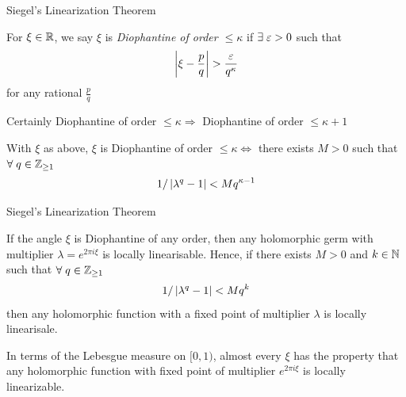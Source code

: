 \begin{frame}{Siegel's Linearization Theorem}
\begin{dfn}
For $\xi \in \mathbb{R}$, we say $\xi$ is \textit{Diophantine of order $\leq \kappa$} if\; $\exists\; \varepsilon > 0$ such that
\[
\left|\xi - \frac{p}{q}\right| > \frac{\varepsilon}{q^{\kappa}}
\]
for any rational $\frac{p}{q}$
\end{dfn}

Certainly Diophantine of order $\leq \kappa \Longrightarrow$ Diophantine of order $\leq \kappa + 1$

\begin{lem}
With $\xi$ as above, $\xi$ is Diophantine of order $\leq \kappa \Longleftrightarrow$ there exists $M > 0$ such that $\forall\; q \in \mathbb{Z}_{\geq 1}$
\[
1/\left|\lambda^{q}-1\right| < Mq^{\kappa - 1}
\]
\end{lem}
\end{frame}

\begin{frame}{Siegel's Linearization Theorem}
\begin{thm}
If the angle $\xi$ is Diophantine of any order, then any
holomorphic germ with multiplier $\lambda = e^{2\pi i\xi}$ is locally linearisable. Hence, if there exists $M > 0$ and $k \in \mathbb{N}$ such that $\forall\; q \in \mathbb{Z}_{\geq 1}$
\[
1/\left|\lambda^{q}-1\right| < Mq^{k}
\]
then any holomorphic function with a fixed point of multiplier $\lambda$ is locally linearisale.
\end{thm}
\begin{cor}
In terms of the Lebesgue measure on $[0,1)$, almost every $\xi$ has the property that any holomorphic function with fixed point of multiplier $e^{2\pi i \xi}$ is locally linearizable. 
\end{cor}
\end{frame}

